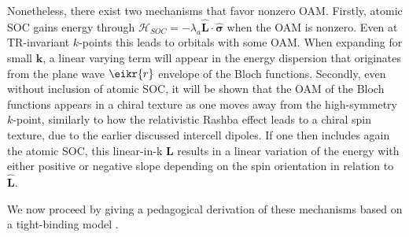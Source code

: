 Nonetheless, there exist two mechanisms that favor nonzero OAM.
Firstly, atomic SOC gains energy through $\mathcal{H}_{SOC} = -\lambda_a \hat{\bm{L}} \cdot \hat{\bm{\sigma}}$ when the OAM is nonzero. Even at TR-invariant $k$-points this leads to orbitals with some OAM.
When expanding for small $\bm{k}$, a linear varying term will appear in the energy dispersion that originates from the plane wave $\eikr{r}$ envelope of the Bloch functions.
Secondly, even without inclusion of atomic SOC, it will be shown that the OAM of the Bloch functions appears in a chiral texture as one moves away from the high-symmetry $k$-point, similarly to how the relativistic Rashba effect leads to a chiral spin texture, due to the earlier discussed intercell dipoles.
If one then includes again the atomic SOC, this linear-in-k $\bm{L}$ results in a linear variation of the energy with either positive or negative slope depending on the spin orientation in relation to $\hat{\bm{L}}$.

We now proceed by giving a pedagogical derivation of these mechanisms based on a tight-binding model \cite{Petersen2000,Go2016}.

